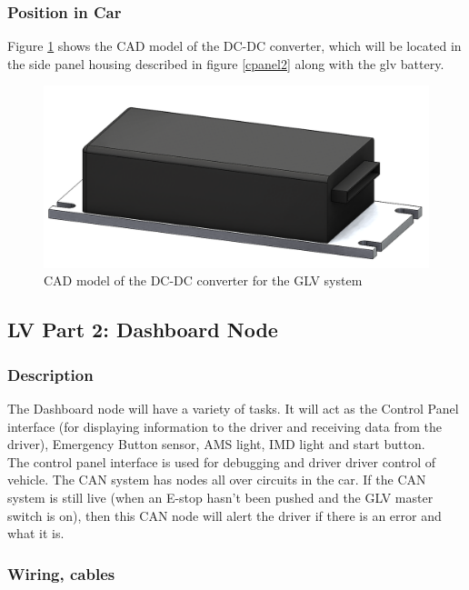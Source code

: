 \documentclass{article}
\begin{document}
        \subsubsection{Position in Car}

            Figure \ref{dcdc_cad} shows the CAD model of the DC-DC converter, which will be located in the side panel housing described in figure \ref{cpanel2} along with the glv battery.

            \begin{figure}[H]
                \centering
                \includegraphics[width = 0.4 \textwidth]{GLV_DCDC}
                \caption{CAD model of the DC-DC converter for the GLV system}
                \label{dcdc_cad}
            \end{figure}

    \subsection{LV Part 2: Dashboard Node}

        \subsubsection{Description}

            The Dashboard node will have a variety of tasks. It will act as the Control Panel interface (for displaying information to the driver and receiving data from the driver), Emergency Button sensor, AMS light, IMD light and start button.\\

            The control panel interface is used for debugging and driver driver control of vehicle. The CAN system has nodes all over circuits in the car. If the CAN system is still live (when an E-stop hasn't been pushed and the GLV master switch is on), then this CAN node will alert the driver if there is an error and what it is.\\

        \subsubsection{Wiring, cables}
\end{document}
